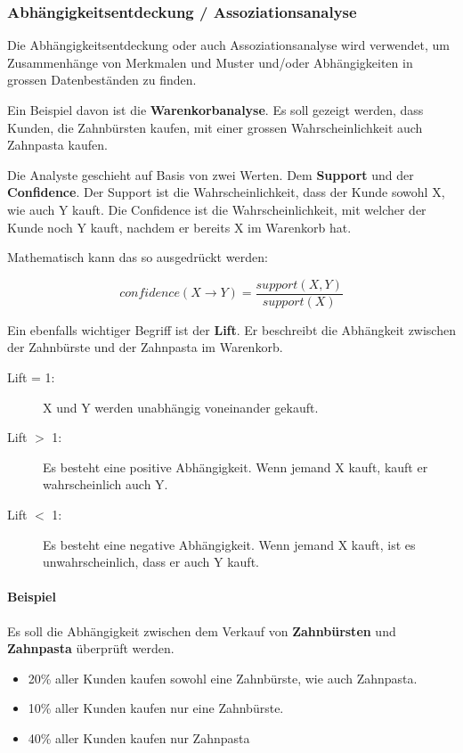 \documentclass[a4paper, 11pt, nofootinbib]{article}
\begin{document}
\newpage

\subsubsection{Abhängigkeitsentdeckung / Assoziationsanalyse}
Die Abhängigkeitsentdeckung oder auch Assoziationsanalyse wird verwendet, um Zusammenhänge von Merkmalen und Muster und/oder Abhängigkeiten in grossen Datenbeständen zu finden. 

Ein Beispiel davon ist die \textbf{Warenkorbanalyse}. Es soll gezeigt werden, dass Kunden, die Zahnbürsten kaufen, mit einer grossen Wahrscheinlichkeit auch Zahnpasta kaufen.
\vspace{10px}

\noindent Die Analyste geschieht auf Basis von zwei Werten. Dem \textbf{Support} und der \textbf{Confidence}. Der Support ist die Wahrscheinlichkeit, dass der Kunde sowohl X, wie auch Y kauft. Die Confidence ist die Wahrscheinlichkeit, mit welcher der Kunde noch Y kauft, nachdem er bereits X im Warenkorb hat.
\vspace{10px}

\noindent Mathematisch kann das so ausgedrückt werden:

\begin{equation}
confidence({X} \rightarrow {Y}) = \dfrac{support({X, Y})}{support({X})}
\end{equation}

Ein ebenfalls wichtiger Begriff ist der \textbf{Lift}. Er beschreibt die Abhängkeit zwischen der Zahnbürste und der Zahnpasta im Warenkorb.

\begin{description}
	\item[Lift = 1: ] X und Y werden unabhängig voneinander gekauft.
	\item[Lift $>$ 1: ] Es besteht eine positive Abhängigkeit. Wenn jemand X kauft, kauft er wahrscheinlich auch Y.
	\item[Lift $<$ 1: ] Es besteht eine negative Abhängigkeit. Wenn jemand X kauft, ist es unwahrscheinlich, dass er auch Y kauft.
\end{description}

\paragraph{Beispiel}
Es soll die Abhängigkeit zwischen dem Verkauf von \textbf{Zahnbürsten} und \textbf{Zahnpasta} überprüft werden.

\begin{itemize}
	\item 20\% aller Kunden kaufen sowohl eine Zahnbürste, wie auch Zahnpasta.
	\item 10\% aller Kunden kaufen nur eine Zahnbürste.
	\item 40\% aller Kunden kaufen nur Zahnpasta
\end{itemize}
\end{document}
